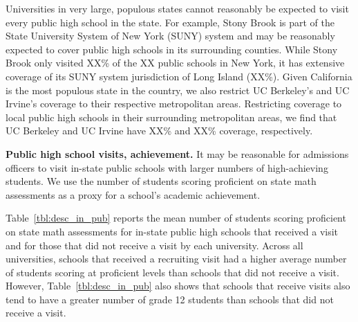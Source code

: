 \documentclass[twoside]{article}
\begin{document}
Universities in very large, populous states cannot reasonably be expected to visit every public high school in the state. For example, Stony Brook is part of the State University System of New York (SUNY) system and may be reasonably expected to cover public high schools in its surrounding counties. While Stony Brook only visited XX\% of the XX public schools in New York, it has extensive coverage of its SUNY system jurisdiction of Long Island (XX\%). Given California is the most populous state in the country, we also restrict UC Berkeley's and UC Irvine's coverage to their respective metropolitan areas. Restricting coverage to local public high schools in their surrounding metropolitan areas, we find that UC Berkeley and UC Irvine have XX\% and XX\% coverage, respectively.



\textbf{Public high school visits, achievement.} It may be reasonable for admissions officers to visit in-state public schools with larger numbers of high-achieving students. We use the number of students scoring proficient on state math assessments as a proxy for a school's academic achievement. 

Table~\ref{tbl:desc_in_pub} reports the mean number of students scoring proficient on state math assessments for in-state public high schools that received a visit and for those that did not receive a visit by each university. Across all universities, schools that received a recruiting visit had a higher average number of students scoring at proficient levels than schools that did not receive a visit. However, Table~\ref{tbl:desc_in_pub} also shows that schools that receive visits also tend to have a greater number of grade 12 students than schools that did not receive a visit.
\end{document}
